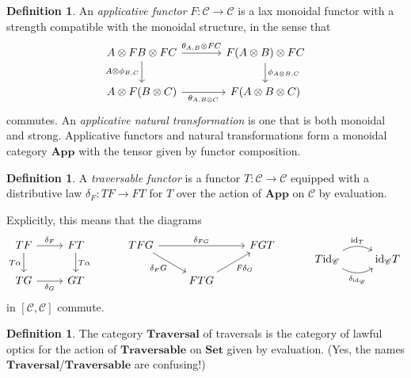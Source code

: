 \documentclass[11pt,letterpaper]{article}
\theoremstyle{plain}
\theoremstyle{definition}
\newtheorem{definition}[theorem]{Definition}
\newcommand{\C}{\mathscr{C}}
\newcommand{\Set}{\mathbf{Set}}
\newcommand{\App}{\mathbf{App}}
\newcommand{\Traversable}{\mathbf{Traversable}}
\newcommand{\Traversal}{\mathbf{Traversal}}
\newcommand{\id}{\mathrm{id}}
\newcommand{\todo}[1]{\textcolor{red}{\small #1}}
\begin{document}
\begin{definition}
An \emph{applicative functor} $F : \C \to \C$ is a lax monoidal functor with a strength compatible with the monoidal structure, in the sense that
\[
\begin{tikzcd}[column sep = large]
A \otimes FB \otimes FC \ar[r, "{\theta_{A, B} \otimes FC}"] \ar[d, swap, "{A \otimes \phi_{B, C}}"] & F(A \otimes B) \otimes FC \ar[d, "{\phi_{A \otimes B, C}}"] \\
A \otimes F(B \otimes C) \ar[r, swap, "{\theta_{A, B \otimes C}}"] & F(A \otimes B \otimes C)
\end{tikzcd}
\]
commutes. An \emph{applicative natural transformation} is one that is both monoidal and strong. Applicative functors and natural transformations form a monoidal category $\App$ with the tensor given by functor composition.
\end{definition}

\begin{definition}
A \emph{traversable functor} is a functor $T : \C \to \C$ equipped with a distributive law $\delta_F : TF \to FT$ for $T$ over the action of $\App$ on $\C$ by evaluation.

Explicitly, this means that the diagrams
\[
  \begin{tikzcd}
    TF \ar[r, "\delta_F"] \ar[d, swap, "T\alpha"] & FT \ar[d, "T\alpha"] \\
    TG \ar[r, swap, "\delta_G"] & GT
  \end{tikzcd} \hspace{1cm}
  \begin{tikzcd}
    TFG \ar[dr, swap, "\delta_F G"] \ar[rr, "\delta_{FG}"] &  & FGT \\
    & FTG \ar[ur, swap, "F \delta_G"] &
  \end{tikzcd} \hspace{1cm}
  \begin{tikzcd}
    T\id_\C \ar[r, bend left, "\id_T"] \ar[r, bend right, swap, "\delta_{\id_\C}"] & \id_\C T
  \end{tikzcd}
\]
in $[\C, \C]$ commute.
\end{definition}

\begin{definition}
The category $\Traversal$ of traversals is the category of lawful optics for the action of $\Traversable$ on $\Set$ given by evaluation. (Yes, the names $\Traversal$/$\Traversable$ are confusing!)
\end{definition}

\end{document}

